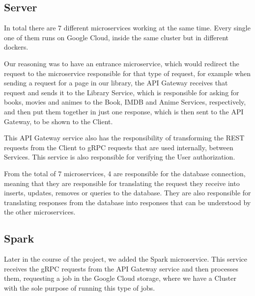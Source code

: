 \documentclass[oneside]{article}
\newcommand*\fpar{\hspace{1ex}}
\begin{document}
  \subsection{Server}
  \fpar In total there are 7 different microservices working at the same time. Every single one of them runs on Google Cloud, inside the same cluster but in different dockers.
  \par Our reasoning was to have an entrance microservice, which would redirect the request to the microservice responsible for that type of request, for example when sending a request for a page in our library, the API Gateway receives that request and sends it to the Library Service, which is responsible for asking for books, movies and animes to the Book, IMDB and Anime Services, respectively, and then put them together in just one response, which is then sent to the API Gateway, to be shown to the Client.
  \par This API Gateway service also has the responsibility of transforming the REST requests from the Client to gRPC requests that are used internally, between Services. This service is also responsible for verifying the User authorization.
  \par From the total of 7 microservices, 4 are responsible for the database connection, meaning that they are responsible for translating the request they receive into inserts, updates, removes or queries to the database. They are also responsible for translating responses from the database into responses that can be understood by the other microservices.

  \subsection{Spark}
  \fpar Later in the course of the project, we added the Spark microservice. This service receives the gRPC requests from the API Gateway service and then processes them, requesting a job in the Google Cloud storage, where we have a Cluster with the sole purpose of running this type of jobs.
\end{document}
